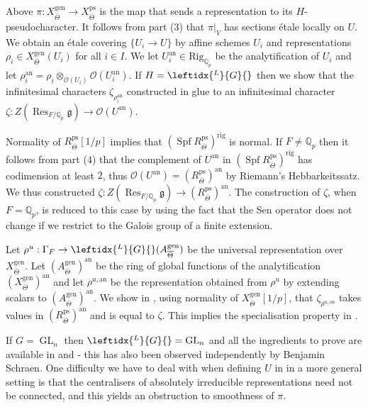\documentclass{amsart}
\theoremstyle{definition}
\theoremstyle{remark}
\DeclareMathOperator{\Res}{Res}
\DeclareMathOperator{\GL}{GL}
\newcommand{\Qp}{\mathbb {Q}_p}
\newcommand{\OO}{\mathcal O}
\newcommand{\ana}{\mathrm{an}}
\newcommand{\gen}{\mathrm{gen}}
\DeclareMathOperator{\Spf}{Spf}
\newcommand{\rig}{\mathrm{rig}}
\newcommand{\Thetabar}{\overline{\Theta}}
\newcommand{\ps}{\mathrm{ps}}
\newcommand{\LG}{\leftidx{^L}{G}{}}
\newcommand{\Rig}{\mathrm{Rig}}
\begin{document}
Above $\pi: X^{\gen}_{\Thetabar} \rightarrow X^{\ps}_{\Thetabar}$ is the map that sends a representation to its $H$-pseudocharacter. It follows from part (3) that $\pi|_V$ has sections \'etale locally on $U$. We obtain an \'etale covering $\{U_i\rightarrow U\}$ by affine schemes $U_i$ and representations $\rho_i\in X^{\gen}_{\Thetabar}(U_i)$ for all
$i\in I$. We let $U_i^{\ana}\in \Rig_{\Qp}$ be the analytification of $U_i$ and let $\rho_i^{\ana}= 
\rho_i\otimes_{\OO(U_i)}\OO(U_i^{\ana})$. If $H=\LG$ then 
we show that the infinitesimal characters $\zeta_{\rho_i^{\ana}}$ constructed in \cite{DPS}
glue to an infinitesimal character 
$\zeta: Z(\Res_{F/\Qp} \mathfrak g) \rightarrow \OO(U^{\ana})$. 

Normality of 
$R^{\ps}_{\Thetabar}[1/p]$ implies  that 
$(\Spf R^{\ps}_{\Thetabar})^\rig$ is normal.
If $F\neq \Qp$ then 
it follows from part (4) that the complement of $U^{\ana}$ in $(\Spf R^{\ps}_{\Thetabar})^{\rig}$ has codimension  at least $2$, thus $\OO(U^{\ana})= (R^{\ps}_{\Thetabar})^{\ana}$ by Riemann's Hebbarkeitssatz. We thus constructed $\zeta:Z(\Res_{F/\Qp} \mathfrak g) \rightarrow (R^{\ps}_{\Thetabar})^{\ana}$. The construction of $\zeta$, when $F=\Qp$, is reduced to this case by 
using the fact that the Sen operator does not 
change if we restrict to the Galois group of a finite extension. 

Let $\rho^u: \Gamma_F \rightarrow \LG(A^{\gen}_{\Thetabar})$ be the universal representation over 
$X^{\gen}_{\Thetabar}$. Let $(A^{\gen}_{\Thetabar})^{\ana}$ be the 
ring of global functions of the analytification $(X^{\gen}_{\Thetabar})^{\ana}$ and let $\rho^{u,\ana}$ be the representation obtained from $\rho^u$  by 
extending scalars to $(A^{\gen}_{\Thetabar})^{\ana}$. We show in , 
using normality of $X^{\gen}_{\Thetabar}[1/p]$, that $\zeta_{\rho^{u,\ana}}$
takes values in $(R^{\ps}_{\Thetabar})^{\ana}$ and is equal to $\zeta$.
This implies the specialisation property in .

If $G=\GL_n$ then $\LG=\GL_n$ and all the 
ingredients to prove   are available in \cite{che_durham} and 
\cite{BIP_new} - this has also been  observed independently by Benjamin Schraen.  One difficulty we have to 
deal with when defining $U$ in   in a more general setting is that 
the centralisers of absolutely irreducible representations need not be connected, and this yields an obstruction to smoothness of $\pi$. 
 
\end{document}
